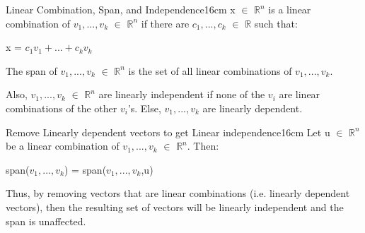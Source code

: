     \begin{definition}{Linear Combination, Span, and Independence}{16cm}
        x $\in$ $\mathbb{R}^n$ is a {\color{lblue} linear combination}
        of $v_1,...,v_k$ $\in$ $\mathbb{R}^n$ if there are
        $c_1,...,c_k$ $\in$ $\mathbb{R}$ such that:

        \hspace{0.5cm}
        x = $c_1v_1 + ... + c_kv_k$

        The {\color{lblue} span} of $v_1,...,v_k$ $\in$ $\mathbb{R}^n$ is the
        set of all linear combinations of $v_1,...,v_k$.

        Also, $v_1,...,v_k$ $\in$ $\mathbb{R}^n$ are
        {\color{lblue} linearly independent}
        if none of the $v_i$ are linear combinations of the other $v_i$'s.
        Else, $v_1,...,v_k$ are {\color{lblue} linearly dependent}.
    \end{definition}

    \newpage



    \begin{wtheorem}{Remove Linearly dependent vectors to get
    Linear independence}{16cm}
        Let u $\in$ $\mathbb{R}^n$ be a linear combination of
        $v_1,...,v_k$ $\in$ $\mathbb{R}^n$. Then:

        \hspace{0.5cm}
        span($v_1,...,v_k$) = span($v_1,...,v_k$,u)

        Thus, by removing vectors that are linear
        combinations (i.e. linearly dependent vectors),
        then the resulting set of vectors will be linearly independent and
        the span is unaffected.
    \end{wtheorem}

